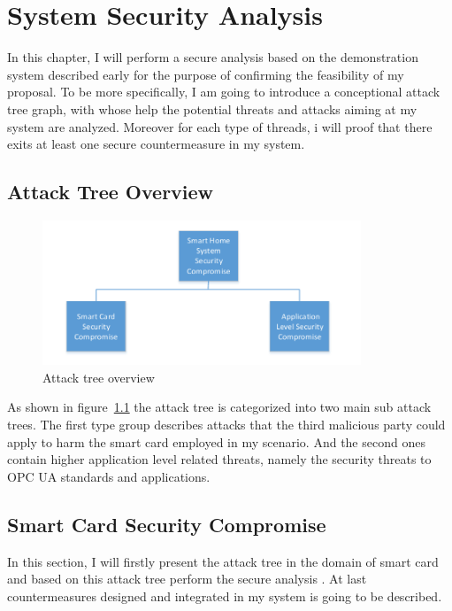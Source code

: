 \chapter{System Security Analysis}
In this chapter, I will perform a secure analysis based on the demonstration system described early for the purpose of confirming the feasibility of my proposal. To be more specifically, I am going to introduce a conceptional attack tree graph, with whose help the potential threats and attacks aiming at my system are analyzed. Moreover for each type of threads, i will proof that there exits at least one secure countermeasure in my system.

\section{Attack Tree Overview}

 \begin{figure}[!htb]
	\centering
	\includegraphics[width=0.85\textwidth]{attack-tree-overview}
		\caption{Attack tree overview}
	\label{fig:attack-tree-overview}
\end{figure}
As shown in figure~\ref{fig:attack-tree-overview} the attack tree is categorized into two main sub attack  trees. The first type group describes attacks that the third malicious party could apply to harm the smart card employed in my scenario. And the second ones contain higher application level related threats, namely the security threats to OPC UA standards and applications. 

\section{Smart Card Security Compromise}
In this section, I will firstly present the attack tree in the domain of smart card and based on this attack tree  perform the secure analysis . At last countermeasures designed and integrated in my system is going to be described.

